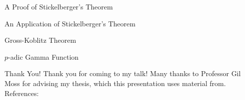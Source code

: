 \documentclass[presentation]{beamer}
\begin{document}
\begin{frame}{A Proof of Stickelberger's Theorem}

\end{frame}

\begin{frame}{An Application of Stickelberger's Theorem}

\end{frame}

\begin{frame}{Gross-Koblitz Theorem}

\end{frame}

\begin{frame}{$p$-adic Gamma Function}

\end{frame}

\begin{frame}{Thank You!}
Thank you for coming to my talk! Many thanks to Professor Gil Moss for advising my thesis, which this presentation uses material from.\\
\medskip
References:
\medskip
    

\end{frame}
\end{document}
